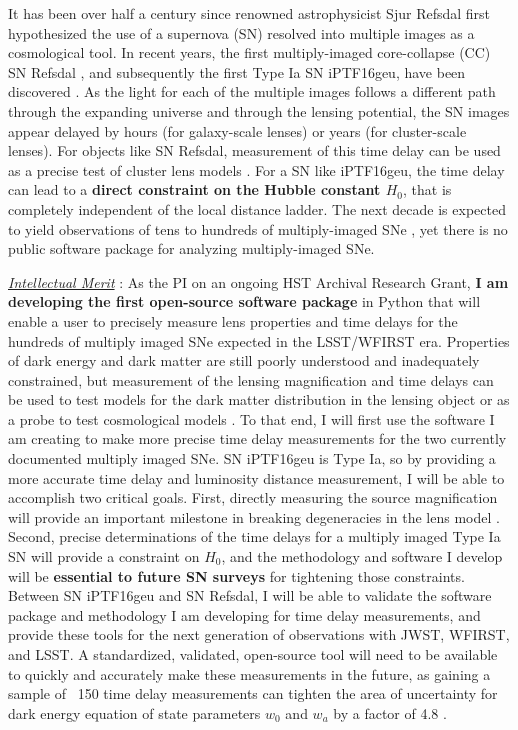 It has  been over  half a century  since renowned  astrophysicist Sjur
Refsdal first hypothesized  the use of a supernova  (SN) resolved into
multiple images  as a  cosmological tool. In  recent years,  the first
multiply-imaged core-collapse (CC) SN Refsdal \citep{Kelly:2015a}, and
subsequently the first Type Ia SN iPTF16geu, have been discovered
\citep{Goobar:2016}. As the light for each of the multiple images
follows a  different path through  the expanding universe  and through
the  lensing potential,  the SN  images appear  delayed by  hours (for
galaxy-scale lenses) or years  (for cluster-scale lenses). For objects
like  SN Refsdal,  measurement of  this time  delay can  be used  as a
precise test of  cluster lens models \citep{Treu:2015}. For  a SN like
iPTF16geu, the time  delay can lead to a  \textbf{direct constraint on
the  Hubble constant  $H_0$}, that  is completely  independent of  the
local  distance  ladder.   The  next  decade  is   expected  to  yield
observations    of    tens     to    hundreds    of    multiply-imaged
SNe \citep{Oguri:2010},  yet there is  no public software  package for
analyzing multiply-imaged SNe.

\noindent\underline{\textit{Intellectual Merit}} :
As the  PI on  an ongoing  HST Archival  Research Grant,  \textbf{I am
developing the first open-source software package} in Python that will
enable a user to precisely measure lens properties and time delays for
the  hundreds  of multiply  imaged  SNe  expected in  the  LSST/WFIRST
era.  Properties of  dark  energy  and dark  matter  are still  poorly
understood  and  inadequately  constrained,  but  measurement  of  the
lensing magnification and  time delays can be used to  test models for
the      dark     matter      distribution     in      the     lensing
object  \citep{Rodney:2015a,Rodney:2016}   or  as  a  probe   to  test
cosmological models \citep{Suyu:2014}.  To that end, I  will first use
the  software  I   am  creating  to  make  more   precise  time  delay
measurements for the two currently  documented multiply imaged SNe. SN
iPTF16geu is Type  Ia, so by providing a more  accurate time delay and
luminosity  distance measurement,  I will  be able  to accomplish  two
critical  goals. First,  directly measuring  the source  magnification
will provide  an important milestone  in breaking degeneracies  in the
lens    model    \citep{Kolatt:1998,Oguri:2003b}.   Second,    precise
determinations of  the time delays  for a  multiply imaged Type  Ia SN
will provide a constraint on $H_0$, and the methodology and software I
develop will be \textbf{essential to future SN surveys} for tightening
those constraints. Between SN iPTF16geu and SN Refsdal, I will be able
to validate the  software package and methodology I  am developing for
time  delay  measurements,  and  provide  these  tools  for  the  next
generation   of  observations   with   JWST,  WFIRST,   and  LSST.   A
standardized, validated, open-source tool will need to be available to
quickly  and accurately  make  these measurements  in  the future,  as
gaining a sample of ~150 time  delay measurements can tighten the area
of uncertainty for dark energy  equation of state parameters $w_0$ and
$w_a$ by a factor of 4.8 \citep{Linder:2011}.

